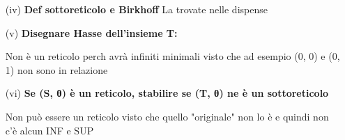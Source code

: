 \begin{itemize}
	\item[(iv)] \textbf{Def sottoreticolo e Birkhoff} 
	La trovate nelle dispense

	\item[(v)] \textbf{Disegnare Hasse dell'insieme T:}
	
	\begin{center}
	\end{center}

	Non è un reticolo perch avrà infiniti minimali visto che ad esempio (0, 0) e (0, 1) non sono in relazione

	\item[(vi)] \textbf{ Se (S, θ) è un reticolo, stabilire se (T, θ) ne è un sottoreticolo} 

	Non può essere un reticolo visto che quello "originale" non lo è e quindi non c'è alcun INF e SUP

\end{itemize}

